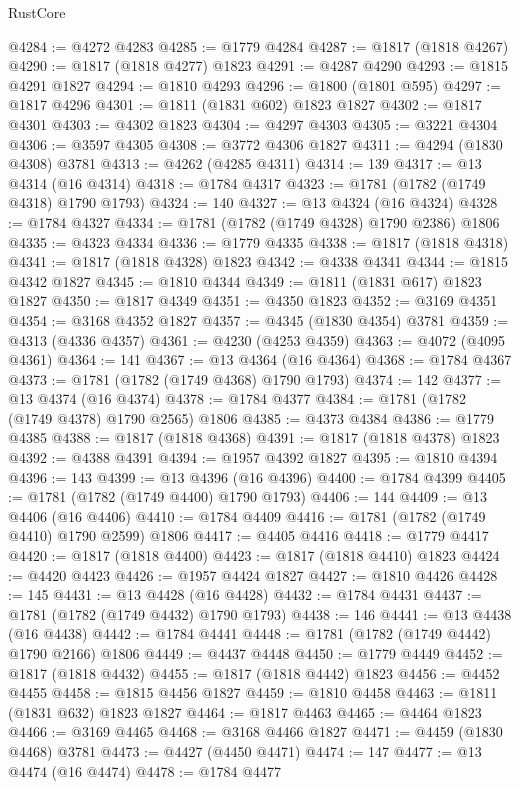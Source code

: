 \begin{lexlean}{RustCore}
\begin{coremodule}
@4284 := @4272 @4283
@4285 := @1779 @4284
@4287 := @1817 (@1818 @4267)
@4290 := @1817 (@1818 @4277) @1823
@4291 := @4287 @4290
@4293 := @1815 @4291 @1827
@4294 := @1810 @4293
@4296 := @1800 (@1801 @595)
@4297 := @1817 @4296
@4301 := @1811 (@1831 @602) @1823 @1827
@4302 := @1817 @4301
@4303 := @4302 @1823
@4304 := @4297 @4303
@4305 := @3221 @4304
@4306 := @3597 @4305
@4308 := @3772 @4306 @1827
@4311 := @4294 (@1830 @4308) @3781
@4313 := @4262 (@4285 @4311)
@4314 := 139
@4317 := @13 @4314 (@16 @4314)
@4318 := @1784 @4317
@4323 := @1781 (@1782 (@1749 @4318) @1790 @1793)
@4324 := 140
@4327 := @13 @4324 (@16 @4324)
@4328 := @1784 @4327
@4334 := @1781 (@1782 (@1749 @4328) @1790 @2386) @1806
@4335 := @4323 @4334
@4336 := @1779 @4335
@4338 := @1817 (@1818 @4318)
@4341 := @1817 (@1818 @4328) @1823
@4342 := @4338 @4341
@4344 := @1815 @4342 @1827
@4345 := @1810 @4344
@4349 := @1811 (@1831 @617) @1823 @1827
@4350 := @1817 @4349
@4351 := @4350 @1823
@4352 := @3169 @4351
@4354 := @3168 @4352 @1827
@4357 := @4345 (@1830 @4354) @3781
@4359 := @4313 (@4336 @4357)
@4361 := @4230 (@4253 @4359)
@4363 := @4072 (@4095 @4361)
@4364 := 141
@4367 := @13 @4364 (@16 @4364)
@4368 := @1784 @4367
@4373 := @1781 (@1782 (@1749 @4368) @1790 @1793)
@4374 := 142
@4377 := @13 @4374 (@16 @4374)
@4378 := @1784 @4377
@4384 := @1781 (@1782 (@1749 @4378) @1790 @2565) @1806
@4385 := @4373 @4384
@4386 := @1779 @4385
@4388 := @1817 (@1818 @4368)
@4391 := @1817 (@1818 @4378) @1823
@4392 := @4388 @4391
@4394 := @1957 @4392 @1827
@4395 := @1810 @4394
@4396 := 143
@4399 := @13 @4396 (@16 @4396)
@4400 := @1784 @4399
@4405 := @1781 (@1782 (@1749 @4400) @1790 @1793)
@4406 := 144
@4409 := @13 @4406 (@16 @4406)
@4410 := @1784 @4409
@4416 := @1781 (@1782 (@1749 @4410) @1790 @2599) @1806
@4417 := @4405 @4416
@4418 := @1779 @4417
@4420 := @1817 (@1818 @4400)
@4423 := @1817 (@1818 @4410) @1823
@4424 := @4420 @4423
@4426 := @1957 @4424 @1827
@4427 := @1810 @4426
@4428 := 145
@4431 := @13 @4428 (@16 @4428)
@4432 := @1784 @4431
@4437 := @1781 (@1782 (@1749 @4432) @1790 @1793)
@4438 := 146
@4441 := @13 @4438 (@16 @4438)
@4442 := @1784 @4441
@4448 := @1781 (@1782 (@1749 @4442) @1790 @2166) @1806
@4449 := @4437 @4448
@4450 := @1779 @4449
@4452 := @1817 (@1818 @4432)
@4455 := @1817 (@1818 @4442) @1823
@4456 := @4452 @4455
@4458 := @1815 @4456 @1827
@4459 := @1810 @4458
@4463 := @1811 (@1831 @632) @1823 @1827
@4464 := @1817 @4463
@4465 := @4464 @1823
@4466 := @3169 @4465
@4468 := @3168 @4466 @1827
@4471 := @4459 (@1830 @4468) @3781
@4473 := @4427 (@4450 @4471)
@4474 := 147
@4477 := @13 @4474 (@16 @4474)
@4478 := @1784 @4477

\end{coremodule}
\end{lexlean}

